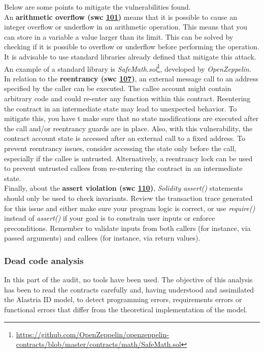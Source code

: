 \documentclass[a4paper, 12pt]{article} %
\begin{document}
            Below are some points to mitigate the vulnerabilities found.\\
            
            An \textbf{arithmetic overflow (\acrshort{swc} \href{https://swcregistry.io/docs/SWC-101}{101})} means that it is possible to cause an integer overflow or underflow in an arithmetic operation. This means that you can store in a variable a value larger than its limit. This can be solved by checking if it is possible to overflow or underflow before performing the operation. It is advisable to use standard libraries already defined that mitigate this attack. An example of a standard library is \textit{SafeMath.sol}\footnote{\url{https://github.com/OpenZeppelin/openzeppelin-contracts/blob/master/contracts/math/SafeMath.sol}}, developed by \textit{OpenZeppelin}.\\
            
            In relation to the \textbf{reentrancy (\acrshort{swc} \href{https://swcregistry.io/docs/SWC-107}{107})}, an external message call to an address specified by the caller can be executed. The callee account might contain arbitrary code and could re-enter any function within this contract. Reentering the contract in an intermediate state may lead to unexpected behavior. To mitigate this, you have t make sure that no state modifications are executed after the call and/or reentrancy guards are in place. Also, with this vulnerability, the contract account state is accessed after an external call to a fixed address. To prevent reentrancy issues, consider accessing the state only before the call, especially if the callee is untrusted. Alternatively, a reentrancy lock can be used to prevent untrusted callees from re-entering the contract in an intermediate state.\\
            
            Finally, about the \textbf{assert violation (\acrshort{swc} \href{https://swcregistry.io/docs/SWC-110}{110})}, \textit{Solidity} \textit{assert()} statements should only be used to check invariants. Review the transaction trace generated for this issue and either make sure your program logic is correct, or use \textit{require()} instead of \textit{assert()} if your goal is to constrain user inputs or enforce preconditions. Remember to validate inputs from both callers (for instance, via passed arguments) and callees (for instance, via return values).

        
        \subsubsection{Dead code analysis}
            In this part of the audit, no tools have been used. The objective of this analysis has been to read the contracts carefully and, having understood and assimilated the Alastria ID model, to detect programming errors, requirements errors or functional errors that differ from the theoretical implementation of the model.\\
            
\end{document}

